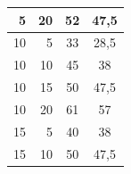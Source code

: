 \begin{table}[!h]
\begin{tabular}{r|r|c|c}
5                                                                                             & 20                                                                                            & 52                                                                                   & 47,5                                                                                 \\
\hline
10                                                                                            & 5                                                                                             & 33                                                                                   & 28,5                                                                                 \\
10                                                                                            & 10                                                                                            & 45                                                                                   & 38                                                                                   \\
10                                                                                            & 15                                                                                            & 50                                                                                   & 47,5                                                                                 \\
10                                                                                            & 20                                                                                            & 61                                                                                   & 57                                                                                   \\
\hline
15                                                                                            & 5                                                                                             & 40                                                                                   & 38                                                                                   \\
15                                                                                            & 10                                                                                            & 50                                                                                   & 47,5                                                                                 \\

\end{tabular}
\end{table}
